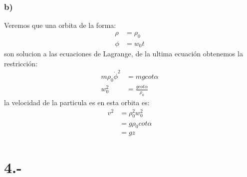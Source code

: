 \documentclass{article}
\begin{document}
\begin{tcolorbox}[breakable]
    \subsubsection*{b)}
    Veremos que una orbita de la forma:
    \begin{align*}
        \rho &= \rho_0 \\
        \phi &= w_0t
    \end{align*}
    son solucion a las ecuaciones de Lagrange, de la ultima ecuación obtenemos la restricción:
    \begin{align*}
        m\rho_0\dot{\phi}^2 &= mgcot\alpha \\
        w_0^2 &= \frac{gcot\alpha}{\rho_0} 
    \end{align*}
    la velocidad de la particula es en esta orbita es: 
    \begin{align*}
        v^2 
        &= \rho_0^2w_0^2 \\
        &= g\rho_0cot\alpha \\ 
        &= gz
    \end{align*}
\end{tcolorbox}

\section*{4.-}
\end{document}
